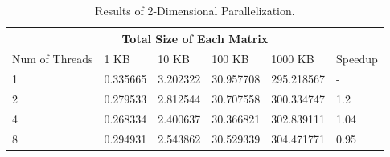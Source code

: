 \documentclass[12pt]{article}
\numberwithin{equation}{section}
\numberwithin{table}{section}
\numberwithin{figure}{section}
\begin{document}
\def\arraystretch{1.3}
\begin{table}
	\centering
	\begin{tabular}{ |p{3cm}||p{2cm}|p{2cm}|p{2cm}|p{2cm}|p{1.5cm}|  }
		
		\hline
		\multicolumn{6}{|c|}{Total Size of Each Matrix} \\
		\hline
		Num of Threads & 1 KB & 10 KB & 100 KB & 1000 KB & Speedup\\
		\hline
		1   & 0.335665    &3.202322 &   30.957708 &   295.218567&   -\\
		2   & 0.279533    &2.812544  &  30.707558 &   300.334747  &   1.2\\
		4   & 0.268334     &2.400637 &   30.366821 &   302.839111&   1.04\\
		8   & 0.294931    &2.543862&   30.529339  &   304.471771&   0.95\\
		\hline
	\end{tabular}
	\caption{Results of 2-Dimensional Parallelization.}
	\label{figsolplot}
\end{table}
\end{document}
